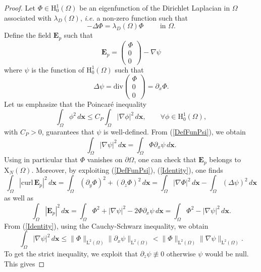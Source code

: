 \documentclass[11pt,a4paper]{article}
\newcommand{\dsp}{\displaystyle}
\newcommand{\Om}{\Omega}
\newcommand{\mrm}[1]{\mathrm{#1}}
\newcommand{\bfx}{\boldsymbol{x}}
\newcommand{\mL}{\mrm{L}}
\newcommand{\mH}{\mrm{H}}
\newcommand{\mX}{\mrm{X}}
\newcommand{\curlvec}{\boldsymbol{\mrm{curl}}\,}
\renewcommand{\div}{\mrm{div}}
\def\E{\boldsymbol{E}}
\begin{document}
\begin{proof}
Let $\Phi\in\mH^1_0(\Om)$ be an eigenfunction of the Dirichlet Laplacian in $\Om$ associated with $\lambda_D(\Om)$, \textit{i.e.} a non-zero function such that 
\[
-\Delta \Phi= \lambda_D(\Om)\Phi\qquad\mbox{ in }\Om.
\]
Define the field $\E_p$ such that
\[
\E_p=\left(\begin{array}{c}
\Phi\\
0\\
0
\end{array}\right)-\nabla\psi
\]
where $\psi$ is the function of $\mH^1_0(\Om)$ such that 
\begin{equation}\label{DefFunPsi}
\Delta \psi=\div \left(\begin{array}{c}
\Phi\\
0\\
0
\end{array}\right)=\partial_x\Phi.
\end{equation}
Let us emphasize that the Poincar\'e inequality
\begin{equation}\label{PoincareIneq}
\int_\Om \phi^2\,d\bfx \le C_P \int_\Om|\nabla \phi|^2\,d\bfx,\qquad\forall\phi\in\mH^1_0(\Om),
\end{equation}
with $C_P>0$, guarantees that $\psi$ is well-defined. From (\ref{DefFunPsi}), we obtain
\begin{equation}\label{Identity}
\dsp\int_{\Om}|\nabla\psi|^2\,d\bfx=\dsp\int_{\Om}\Phi\partial_x\psi\,d\bfx.
\end{equation}
Using in particular that $\Phi$ vanishes on $\partial\Om$, one can check that $\E_p$ belongs to $\boldsymbol{\mX}_N(\Om)$. Moreover, by exploiting (\ref{DefFunPsi}),  (\ref{Identity}), one finds
\begin{equation}\label{CalculCurl}
\dsp\int_{\Om}|\curlvec\E_p|^2\,d\bfx = \dsp\int_{\Om}(\partial_y\Phi)^2+(\partial_z\Phi)^2\,d\bfx = \dsp\int_{\Om}|\nabla\Phi|^2\,d\bfx - \dsp\int_{\Om}(\Delta\psi)^2\,d\bfx
\end{equation}
as well as 
\begin{equation}\label{CalculNormL2}
\dsp\int_{\Om}|\E_p|^2\,d\bfx =\dsp\int_{\Om}\Phi^2+|\nabla\psi|^2-2\Phi\partial_x\psi\,d\bfx=\dsp\int_{\Om}\Phi^2-|\nabla\psi|^2\,d\bfx.
\end{equation}
From (\ref{Identity}), using the Cauchy-Schwarz inequality, we obtain 
\[
\dsp\int_{\Om}|\nabla\psi|^2\,d\bfx \le \|\Phi\|_{\mL^2(\Om)}\|\partial_x\psi\|_{\mL^2(\Om)} <\|\Phi\|_{\mL^2(\Om)}\|\nabla\psi\|_{\boldsymbol{\mL}^2(\Om)}.
\]
To get the strict inequality, we exploit that $\partial_z\psi\not\equiv0$ otherwise $\psi$ would be null. This gives 

\end{proof}
\end{document}
